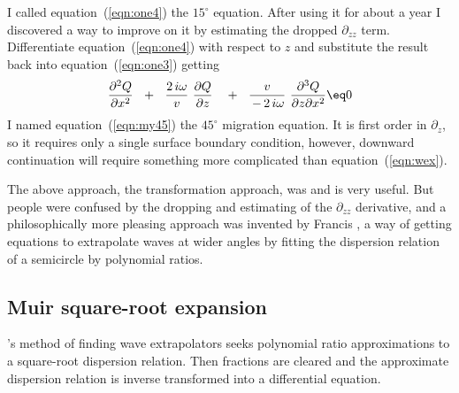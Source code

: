 \par
I called equation~(\ref{eqn:one4}) the $15^\circ$ equation.
After using it for about a year I discovered a way to improve on it
by estimating the dropped $\partial_{zz}$ term.
Differentiate equation~(\ref{eqn:one4}) with respect to $z$
and substitute the result back into equation~(\ref{eqn:one3})
getting
\begin{equation}
{\partial^2 Q  \over \partial x^2}  \ \ +\ \ 
{2\, i \omega  \over v }\  {\partial Q  \over \partial z} \ \ \ +\ \ 
{v \over \,-\,2\, i \omega} \   {\partial^3 Q  \over \partial z \partial x^2} 
\eq 0
\label{eqn:my45}
\end{equation}
I named equation~(\ref{eqn:my45}) the $45^\circ$ migration equation.
It is first order in $\partial_z$,
so it requires only a single surface boundary condition,
however, downward continuation will require
something more complicated than equation~(\ref{eqn:wex}).
\par
The above approach,
the transformation approach,
was and is very useful.
But people were confused by the dropping and estimating of the $\partial_{zz}$
derivative, and a philosophically more pleasing approach was
invented by Francis \bx{Muir},
a way of getting equations to extrapolate waves at wider angles
by fitting the dispersion relation of a semicircle
by polynomial ratios.
\subsection{Muir square-root expansion}
\par
{}'s method of finding wave extrapolators
seeks polynomial ratio approximations
to a square-root dispersion relation.
Then fractions are cleared
and the approximate dispersion relation is inverse transformed
into a differential equation.

